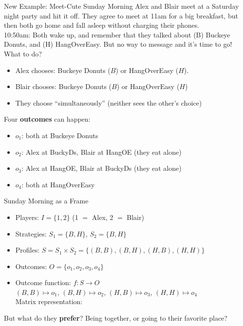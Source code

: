\begin{frame}{New Example: Meet-Cute Sunday Morning}
Alex and Blair meet at a Saturday night party and hit it off. They agree to meet at 11am for a big breakfast, but then both go home and fall asleep without charging their phones.\\
10:50am: Both wake up, and remember that they talked about (B) Buckeye Donuts, and (H) HangOverEasy. But no way to message and it's time to go! What to do?
\bsk
\begin{itemize}
    \item Alex chooses: Buckeye Donuts ($B$) or HangOverEasy ($H$).
    \item Blair chooses: Buckeye Donuts ($B$) or HangOverEasy ($H$)
    \item They choose ``simultaneously'' (neither sees the other's choice)
\end{itemize}
\bsk
Four \textbf{outcomes} can happen:
\begin{itemize}
    \item $o_1$: both at Buckeye Donuts
    \item $o_2$: Alex at BuckyDs, Blair at HangOE (they eat alone)
    \item $o_3$: Alex at HangOE, Blair at BuckyDs (they eat alone)
    \item $o_4$: both at HangOverEasy
\end{itemize}
\end{frame}

\begin{frame}{Sunday Morning as a Frame}
\begin{itemize}
    \item Players: \hspace{0.5in} $I=\{1,2\}$ \hspace{0.2in} (1 $=$ Alex, 2 $=$ Blair)
    \item Strategies: \hspace{0.28in} $S_1=\{B,H\}$, \hspace{0.1in} $S_2=\{B,H\}$
    \item Profiles: \hspace{0.45in} $S=S_1\times S_2=\{(B,B),(B,H),(H,B),(H,H)\}$
    \item Outcomes: \hspace{0.29in} $O=\{o_1,o_2,o_3,o_4\}$
    \item Outcome function: $f:S\to O$\\
    $(B,B)\mapsto o_1$, $(B,H)\mapsto o_2$, $(H,B)\mapsto o_3$, $(H,H)\mapsto o_4$\\
    Matrix representation:
\end{itemize}
\bsk
\begin{center}
\begin{matrixgame}[top left={B, H}, w=1.2]
\end{matrixgame}
\end{center}
But what do they \textbf{prefer}? Being together, or going to their favorite place?
\end{frame}

